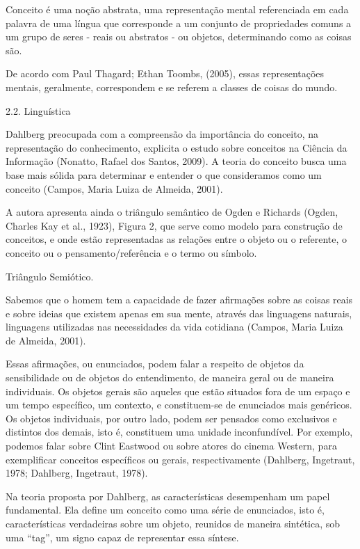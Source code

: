 Conceito é uma noção abstrata, uma representação mental referenciada em cada palavra de uma língua que corresponde a um conjunto de propriedades comuns a um grupo de seres - reais ou abstratos - ou objetos, determinando como as coisas são.

De acordo com Paul Thagard; Ethan Toombs, (2005), essas representações mentais, geralmente, correspondem e se referem a classes de coisas do mundo.

2.2. Linguística

Dahlberg preocupada com a compreensão da importância do conceito, na representação do conhecimento, explicita o estudo sobre conceitos na Ciência da Informação (Nonatto, Rafael dos Santos, 2009). A teoria do conceito busca uma base mais sólida para determinar e entender o que consideramos como um conceito (Campos, Maria Luiza de Almeida, 2001).

A autora apresenta ainda o triângulo semântico de Ogden e Richards (Ogden, Charles Kay et al., 1923), Figura 2, que serve como modelo para construção de conceitos, e onde estão representadas as relações entre o objeto ou o referente, o conceito ou o pensamento/referência e o termo ou símbolo.


Triângulo Semiótico.

Sabemos que o homem tem a capacidade de fazer afirmações sobre as coisas reais e sobre ideias que existem apenas em sua mente, através das linguagens naturais, linguagens utilizadas nas necessidades da vida cotidiana (Campos, Maria Luiza de Almeida, 2001).

Essas afirmações, ou enunciados, podem falar a respeito de objetos da sensibilidade ou de objetos do entendimento, de maneira geral ou de maneira individuais. Os objetos gerais são aqueles que estão situados fora de um espaço e um tempo específico, um contexto, e constituem-se de enunciados mais genéricos. Os objetos individuais, por outro lado, podem ser pensados como exclusivos e distintos dos demais, isto é, constituem uma unidade inconfundível. Por exemplo, podemos falar sobre Clint Eastwood ou sobre atores do cinema Western, para exemplificar conceitos específicos ou gerais, respectivamente (Dahlberg, Ingetraut, 1978; Dahlberg, Ingetraut, 1978).

Na teoria proposta por Dahlberg, as características desempenham um papel fundamental. Ela define um conceito como uma série de enunciados, isto é, características verdadeiras sobre um objeto, reunidos de maneira sintética, sob uma ``tag'', um signo capaz de representar essa síntese.

